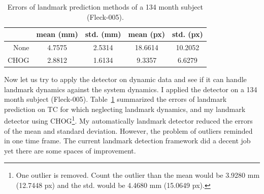 \begin{table}
  \centering
   \caption{Errors of landmark prediction methods of a 134 month subject (Fleck-005).
   }
  \begin{tabular}{r || cccc}
  & mean (mm) & std. (mm) & mean (px) & std. (px) \\
  \hline
  None & 4.7575 & 2.5314 & 18.6614 & 10.2052 \\
  CHOG & 2.8812 & 1.6134 & 9.3357 & 6.6279 \\
  \end{tabular}
  \label{tab:landmarks}
\end{table}


Now let us try to apply the detector on dynamic data and see if it can handle landmark dynamics against the system dynamics.
I applied the detector on a 134 month subject (Fleck-005).
Table~\ref{tab:landmarks} summarized the errors of landmark prediction on TC for which neglecting landmark dynamics, and my landmark detector using CHOG\footnote{One outlier is removed. Count the outlier than the mean would be 3.9280 mm (12.7448 px) and the std. would be 4.4680 mm (15.0649 px).}.
My automatically landmark detector reduced the errors of the mean and standard deviation.
However, the problem of outliers reminded in one time frame.
The current landmark detection framework did a decent job yet there are some spaces of improvement.


